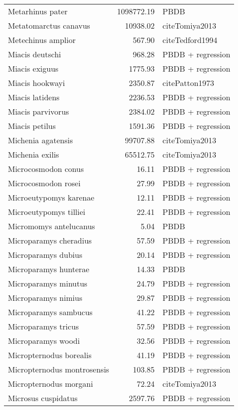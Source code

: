 \begin{table}[ht]
\begin{tabular}{lrl}
  Metarhinus pater & 1098772.19 & PBDB \\ 
  Metatomarctus canavus & 10938.02 & cite{Tomiya2013} \\ 
  Metechinus amplior & 567.90 & cite{Tedford1994} \\ 
  Miacis deutschi & 968.28 & PBDB + regression \\ 
  Miacis exiguus & 1775.93 & PBDB + regression \\ 
  Miacis hookwayi & 2350.87 & cite{Patton1973} \\ 
  Miacis latidens & 2236.53 & PBDB + regression \\ 
  Miacis parvivorus & 2384.02 & PBDB + regression \\ 
  Miacis petilus & 1591.36 & PBDB + regression \\ 
  Michenia agatensis & 99707.88 & cite{Tomiya2013} \\ 
  Michenia exilis & 65512.75 & cite{Tomiya2013} \\ 
  Microcosmodon conus & 16.11 & PBDB + regression \\ 
  Microcosmodon rosei & 27.99 & PBDB + regression \\ 
  Microeutypomys karenae & 12.11 & PBDB + regression \\ 
  Microeutypomys tilliei & 22.41 & PBDB + regression \\ 
  Micromomys antelucanus & 5.04 & PBDB \\ 
  Microparamys cheradius & 57.59 & PBDB + regression \\ 
  Microparamys dubius & 20.14 & PBDB + regression \\ 
  Microparamys hunterae & 14.33 & PBDB \\ 
  Microparamys minutus & 24.79 & PBDB + regression \\ 
  Microparamys nimius & 29.87 & PBDB + regression \\ 
  Microparamys sambucus & 41.22 & PBDB + regression \\ 
  Microparamys tricus & 57.59 & PBDB + regression \\ 
  Microparamys woodi & 32.56 & PBDB + regression \\ 
  Micropternodus borealis & 41.19 & PBDB + regression \\ 
  Micropternodus montrosensis & 103.85 & PBDB + regression \\ 
  Micropternodus morgani & 72.24 & cite{Tomiya2013} \\ 
  Microsus cuspidatus & 2597.76 & PBDB + regression \\ 

\end{tabular}
\end{table}
